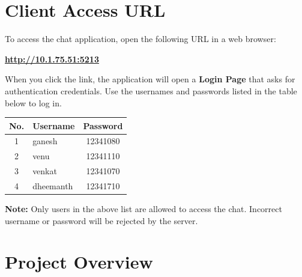 \documentclass[11pt,a4paper]{article}
\begin{document}
\newpage


\section{Client Access URL}

To access the chat application, open the following URL in a web browser:

\begin{mdframed}[
    backgroundcolor=codebg,
    linecolor=bordercolor,
    linewidth=1pt,
    roundcorner=4pt,
    innertopmargin=8pt,
    innerbottommargin=8pt
]
    \centering
    \textbf{\large \color{primaryblue} \url{http://10.1.75.51:5213}}
\end{mdframed}

\vspace{0.3cm}

When you click the link, the application will open a \textbf{Login Page} that asks for authentication credentials. Use the usernames and passwords listed in the table below to log in.

\vspace{0.3cm}

\begin{center}
\begin{tabular}{clc}
    \toprule
    \textbf{No.} & \textbf{Username} & \textbf{Password} \\
    \midrule
    1 & ganesh     & 12341080 \\
    2 & venu       & 12341110 \\
    3 & venkat     & 12341070 \\
    4 & dheemanth  & 12341710 \\
    \bottomrule
\end{tabular}
\end{center}

\vspace{0.2cm}

\textbf{Note:} Only users in the above list are allowed to access the chat. Incorrect username or password will be rejected by the server.


\section{Project Overview}
\end{document}
